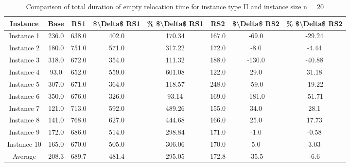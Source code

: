 \begin{table}[H]
\centering
\begin{tabular}{cccccccc}
  \hline
  \textbf{Instance} & \textbf{Base} & \textbf{RS1} & \textbf{\$\textbackslash{}Delta\$  RS1} & \textbf{\% \$\textbackslash{}Delta\$  RS1} & \textbf{RS2} & \textbf{\$\textbackslash{}Delta\$  RS2} & \textbf{\% \$\textbackslash{}Delta\$  RS2} \\\hline
  Instance 1 & 236.0 & 638.0 & 402.0 & 170.34 & 167.0 & -69.0 & -29.24 \\
  Instance 2 & 180.0 & 751.0 & 571.0 & 317.22 & 172.0 & -8.0 & -4.44 \\
  Instance 3 & 318.0 & 672.0 & 354.0 & 111.32 & 188.0 & -130.0 & -40.88 \\
  Instance 4 & 93.0 & 652.0 & 559.0 & 601.08 & 122.0 & 29.0 & 31.18 \\
  Instance 5 & 307.0 & 671.0 & 364.0 & 118.57 & 248.0 & -59.0 & -19.22 \\
  Instance 6 & 350.0 & 676.0 & 326.0 & 93.14 & 169.0 & -181.0 & -51.71 \\
  Instance 7 & 121.0 & 713.0 & 592.0 & 489.26 & 155.0 & 34.0 & 28.1 \\
  Instance 8 & 141.0 & 768.0 & 627.0 & 444.68 & 166.0 & 25.0 & 17.73 \\
  Instance 9 & 172.0 & 686.0 & 514.0 & 298.84 & 171.0 & -1.0 & -0.58 \\
  Instance 10 & 165.0 & 670.0 & 505.0 & 306.06 & 170.0 & 5.0 & 3.03 \\
  Average & 208.3 & 689.7 & 481.4 & 295.05 & 172.8 & -35.5 & -6.6 \\\hline
\end{tabular}
\caption{Comparison of total duration of empty relocation time for instance type II and instance size n = 20}
\label{tab:wait:resrelocation-empty-relocation-comparison_II_20}
\end{table}
